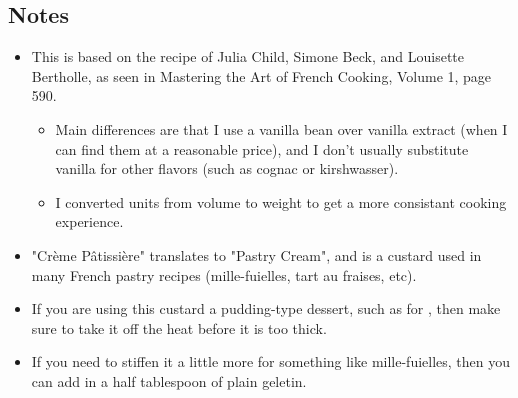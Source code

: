 \begin{multicols}{2}
\subsection*{Notes}
\begin{itemize}
    \item This is based on the recipe of Julia Child, Simone Beck, and Louisette Bertholle, as seen in Mastering the Art of French Cooking, Volume 1, page 590. 
    \begin{itemize}
        \item Main differences are that I use a vanilla bean over vanilla extract (when I can find them at a reasonable price), and I don't usually substitute vanilla for other flavors (such as cognac or kirshwasser).
        \item I converted units from volume to weight to get a more consistant cooking experience.
    \end{itemize}
    \item "Crème Pâtissière" translates to "Pastry Cream", and is a custard used in many French pastry recipes (mille-fuielles, tart au fraises, etc).
    \item If you are using this custard a pudding-type dessert, such as for , then make sure to take it off the heat before it is too thick.
    \item If you need to stiffen it a little more for something like mille-fuielles, then you can add in a half tablespoon of plain geletin.
\end{itemize}
\end{multicols}
\clearpage